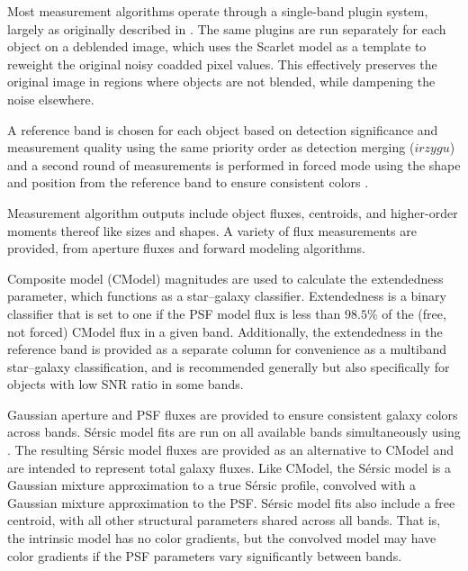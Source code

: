 Most measurement algorithms operate through a single-band plugin system, largely as originally described in \citet{2018PASJ...70S...5B}.
The same plugins are run separately for each object on a deblended image, which uses the Scarlet model as a template to reweight the original noisy coadded pixel values.
This effectively preserves the original image in regions where objects are not blended, while dampening the noise elsewhere.

A reference band is chosen for each object based on detection significance and measurement quality using the same priority order as detection merging ($irzygu$) and a second round of measurements is performed in forced mode using the shape and position from the reference band to ensure consistent colors \citep[][]{2018PASJ...70S...5B}.

Measurement \gls{algorithm} outputs include object fluxes, centroids, and higher-order moments thereof like sizes and shapes. A variety of \gls{flux} measurements are provided, from aperture fluxes and forward modeling algorithms.

Composite model (CModel) magnitudes \citep[][]{2004AJ....128..502A, 2018PASJ...70S...5B} are used to calculate the extendedness parameter, which functions as a star--galaxy classifier.
Extendedness is a binary classifier that is set to one if the PSF model flux is less than $98.5\%$ of the (free, not forced) CModel flux in a given band.
Additionally, the extendedness in the reference band is provided as a separate column for convenience as a multiband star--galaxy classification, and is recommended generally but also specifically for objects with low \gls{SNR} ratio in some bands.

Gaussian aperture and PSF \citep[\gls{GAaP}][]{2008A&A...482.1053K, DMTN-190} fluxes are provided to ensure consistent galaxy colors across bands.
S\'ersic model \citep[][]{1963BAAA....6...41S, 1968adga.book.....S} fits are run on all available bands simultaneously using \cite[MultiProFit;][]{DMTN-312}.
The resulting S\'ersic model fluxes are provided as an alternative to CModel and are intended to represent total galaxy fluxes.
Like CModel, the S\'ersic model is a Gaussian mixture approximation to a true S\'ersic profile, convolved with a Gaussian mixture approximation to the \gls{PSF}.
S\'ersic model fits also include a free centroid, with all other structural parameters shared across all bands.
That is, the intrinsic model has no color gradients, but the convolved model may have color gradients if the \gls{PSF} parameters vary significantly between bands.

